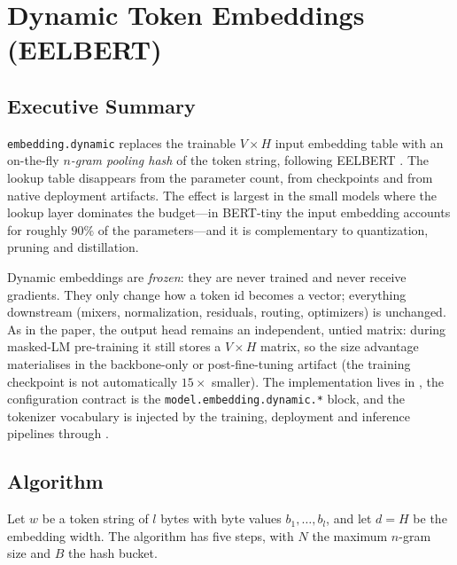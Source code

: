 \section{Dynamic Token Embeddings (EELBERT)}
\label{sec:annex-dynamic-embeddings}

\subsection{Executive Summary}

\texttt{embedding.dynamic} replaces the trainable $V\times H$ input embedding table with an on-the-fly \emph{$n$-gram pooling hash} of the token string, following EELBERT \citep{cohn_eelbert_2023}. The lookup table disappears from the parameter count, from checkpoints and from native deployment artifacts. The effect is largest in the small models where the lookup layer dominates the budget---in BERT-tiny the input embedding accounts for roughly $90\%$ of the parameters---and it is complementary to quantization, pruning and distillation.

Dynamic embeddings are \emph{frozen}: they are never trained and never receive gradients. They only change how a token id becomes a vector; everything downstream (mixers, normalization, residuals, routing, optimizers) is unchanged. As in the paper, the output head remains an independent, untied matrix: during masked-LM pre-training it still stores a $V\times H$ matrix, so the size advantage materialises in the backbone-only or post-fine-tuning artifact (the training checkpoint is not automatically $15\times$ smaller). The implementation lives in , the configuration contract is the \texttt{model.embedding.dynamic.*} block, and the tokenizer vocabulary is injected by the training, deployment and inference pipelines through .

\subsection{Algorithm}

Let $w$ be a token string of $l$ bytes with byte values $b_1,\dots,b_l$, and let $d=H$ be the embedding width. The algorithm has five steps, with $N$ the maximum $n$-gram size and $B$ the hash bucket.

